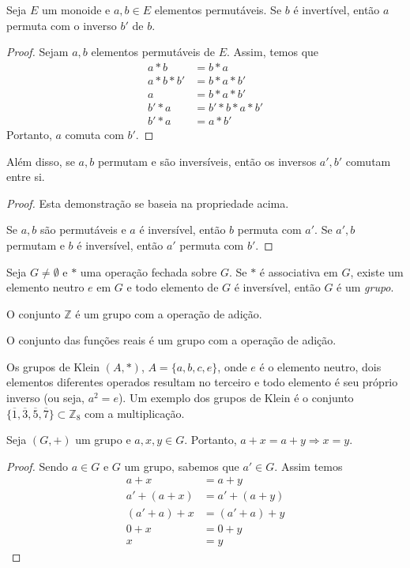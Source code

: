 \begin{prop}
Seja $E$ um monoide e $a,b \in E$ elementos permutáveis. Se $b$ é invertível, então $a$ permuta com o inverso $b'$ de $b$.
\begin{proof}
Sejam $a,b$ elementos permutáveis de $E$. Assim, temos que
\begin{align*}
a*b&=b*a \\
a*b*b'&=b*a*b' \\
a&=b*a*b' \\
b'*a&=b'*b*a*b'\\
b'*a&=a*b'
\end{align*}
Portanto, $a$ comuta com $b'$.
\end{proof}
Além disso, se $a,b$ permutam e são inversíveis, então os inversos $a',b'$ comutam entre si.
\begin{proof}
Esta demonstração se baseia na propriedade acima. \par Se $a,b$ são permutáveis e $a$ é inversível, então $b$ permuta com $a'$. Se $a', b$ permutam e $b$ é inversível, então $a'$ permuta com $b'$.
\end{proof}
\end{prop}

\begin{df}
Seja $G\neq\emptyset$ e $*$ uma operação fechada sobre $G$. Se $*$ é associativa em $G$, existe um elemento neutro $e$ em $G$ e todo elemento de $G$ é inversível, então $G$ é um \emph{grupo}.
\end{df}
\begin{exemplo}
O conjunto $\mathbb{Z}$ é um grupo com a operação de adição. \par O conjunto das funções reais é um grupo com a operação de adição. \par Os grupos de Klein $(A,*)$, $A=\{a,b,c,e\}$, onde $e$ é o elemento neutro, dois elementos diferentes operados resultam no terceiro e todo elemento é seu próprio inverso (ou seja, $a^2=e$). Um exemplo dos grupos de Klein é o conjunto $\{\overline{1},\overline{3},\overline{5},\overline{7}\}\subset\mathbb{Z}_8$ com a multiplicação.
\end{exemplo}
\begin{prop}
Seja $(G,+)$ um grupo e $a,x,y \in G$. Portanto, $a+x=a+y \Rightarrow x=y$.
\begin{proof}
Sendo $a \in G$ e $G$ um grupo, sabemos que $a' \in G$. Assim temos
\begin{align*}
a+x&=a+y \\
a'+(a+x)&=a'+(a+y) \\
(a'+a)+x&=(a'+a)+y \\
0+x&=0+y\\
x&=y
\end{align*}
\end{proof}
\end{prop}


